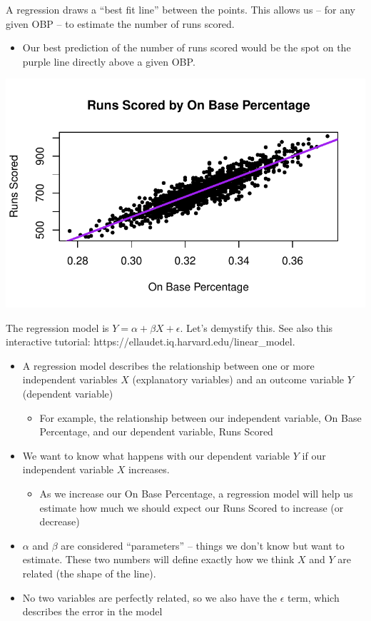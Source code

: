 \documentclass[
  letterpaper,
  DIV=11,
  numbers=noendperiod]{scrreprt}
\providecommand{\tightlist}{%
  \setlength{\itemsep}{0pt}\setlength{\parskip}{0pt}}\usepackage{longtable,booktabs,array}
\begin{document}
A regression draws a ``best fit line'' between the points. This allows
us -- for any given OBP -- to estimate the number of runs scored.

\begin{itemize}
\tightlist
\item
  Our best prediction of the number of runs scored would be the spot on
  the purple line directly above a given OBP.
\end{itemize}

\includegraphics{08-Regression_files/figure-pdf/unnamed-chunk-6-1.pdf}

The regression model is \(Y = \alpha + \beta X + \epsilon\). Let's
demystify this. See also this interactive tutorial:
https://ellaudet.iq.harvard.edu/linear\_model.

\begin{itemize}
\tightlist
\item
  A regression model describes the relationship between one or more
  independent variables \(X\) (explanatory variables) and an outcome
  variable \(Y\) (dependent variable)

  \begin{itemize}
  \tightlist
  \item
    For example, the relationship between our independent variable, On
    Base Percentage, and our dependent variable, Runs Scored
  \end{itemize}
\item
  We want to know what happens with our dependent variable \(Y\) if our
  independent variable \(X\) increases.

  \begin{itemize}
  \tightlist
  \item
    As we increase our On Base Percentage, a regression model will help
    us estimate how much we should expect our Runs Scored to increase
    (or decrease)
  \end{itemize}
\item
  \(\alpha\) and \(\beta\) are considered ``parameters'' -- things we
  don't know but want to estimate. These two numbers will define exactly
  how we think \(X\) and \(Y\) are related (the shape of the line).
\item
  No two variables are perfectly related, so we also have the
  \(\epsilon\) term, which describes the error in the model
\end{itemize}
\end{document}
